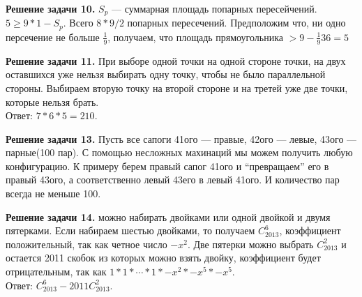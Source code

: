 \documentclass[a4paper,12pt]{article}
\newenvironment{problem}[1]{\par\bigskip\noindent\textbf{Решение задачи #1.}
  \enskip\ignorespaces}{}
\begin{document}
  \begin{problem}{10}
    $S_p$ --- суммарная площадь попарных пересейчений. $5 \geq 9 * 1 - S_p$.
    Всего $8*9/2$ попарных пересечений. Предположим что, ни одно персечение не
    больше $\frac{1}{9}$, получаем, что площадь прямоугольника
    $> 9 - \frac{1}{9} 36 = 5$
  \end{problem}

  \begin{problem}{11}
    При выборе одной точки на одной стороне точки, на двух оставшихся уже
    нельзя выбирать одну точку, чтобы не было параллельной стороны. Выбираем
    вторую точку на второй стороне и на третей уже две точки, которые нельзя
    брать. \\

    Ответ: $7*6*5 = 210$.
  \end{problem}

  \begin{problem}{13}
    Пусть все сапоги 41ого --- правые, 42ого --- левые, 43ого --- парные(100
    пар). С помощью несложных махинаций мы можем получить любую конфигурацию.
    К примеру берем правый сапог 41ого и ``превращаем'' его в правый 43ого,
    а соответственно левый 43его в левый 41ого. И количество пар всегда не
    меньше 100.
  \end{problem}

  \pagebreak
  \begin{problem}{14}
    12 можно набирать двойками или одной двойкой и двумя пятерками. Если
    набираем шестью двойками, то получаем $C_{2013}^6$, коэффициент
    положительный, так как четное число $-x^2$. Две пятерки можно выбрать
    $C_{2013}^2$ и остается 2011 скобок из которых можно взять двойку,
    коэффициент будет отрицательным, так как
    $1 * 1 * \cdots * 1 * -x^2 * -x^5 * -x^5$. \\

    Ответ: $C_{2013}^6 - 2011C_{2013}^2$.
  \end{problem}

\end{document}
